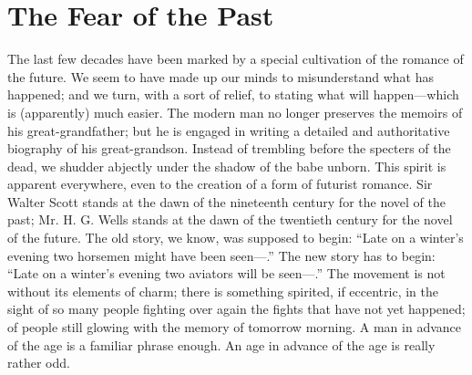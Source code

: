 \documentclass{book}
\begin{document}
\chapter{The Fear of the Past}
\label{chapter-5}
The last few decades have been marked by a special cultivation of the romance of the future. We seem to have made up our minds to misunderstand what has happened; and we turn, with a sort of relief, to stating what will happen—which is (apparently) much easier. The modern man no longer preserves the memoirs of his great-grandfather; but he is engaged in writing a detailed and authoritative biography of his great-grandson. Instead of trembling before the specters of the dead, we shudder abjectly under the shadow of the babe unborn. This spirit is apparent everywhere, even to the creation of a form of futurist romance. Sir Walter Scott stands at the dawn of the nineteenth century for the novel of the past; Mr. H. G. Wells stands at the dawn of the twentieth century for the novel of the future. The old story, we know, was supposed to begin: “Late on a winter’s evening two horsemen might have been seen—.” The new story has to begin: “Late on a winter’s evening two aviators will be seen—.” The movement is not without its elements of charm; there is something spirited, if eccentric, in the sight of so many people fighting over again the fights that have not yet happened; of people still glowing with the memory of tomorrow morning. A man in advance of the age is a familiar phrase enough. An age in advance of the age is really rather odd.
\end{document}
